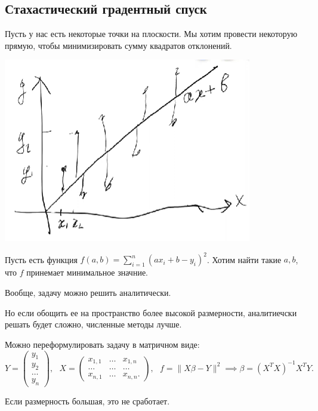 \subsection{Стахастический градентный спуск}
\begin{problem}
    Пусть у нас есть некоторые точки на плоскости. Мы хотим провести некоторую прямую, чтобы минимизировать сумму квадратов отклонений.

    \begin{center}
        \includegraphics[scale=0.5]{img/linear_regression_problem}
    \end{center}

    Пусть есть функция $f(a, b) = \sum_{i=1}^n \left( a x_i + b - y_i \right)^2$. Хотим найти такие $a, b$, что $f$ принемает минимальное значние.

    Вообще, задачу можно решить аналитически.

    Но если обощить ее  на пространство более высокой размерности, аналитиечски решать будет сложно, численные методы лучше.

    Можно переформулировать задачу в матричном виде:
    \[Y = \begin{pmatrix}
        y_1\\ y_2\\ \dots\\ y_n 
    \end{pmatrix}, ~~~X = \begin{pmatrix}
        x_{1,1} & \dots & x_{1,n}\\
        \dots & \dots & \dots\\
        x_{n,1} & \dots & x_{n,n}.
    \end{pmatrix}, ~~~
    f = \| X \beta - Y \| ^2 \implies
    \beta = \left( X^T X \right) ^{-1} X ^T Y.\]

    Если размерность большая, это не сработает.
\end{problem}


